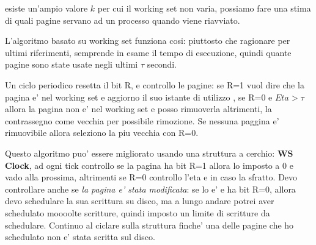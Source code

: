        esiste un'ampio valore $k$ per cui il working set non varia, possiamo fare una stima di quali pagine
        servano ad un processo quando viene riavviato.

        L'algoritmo basato su working set funziona cosi: piuttosto che ragionare per ultimi riferimenti, semprende
        in esame il tempo di esecuzione, quindi quante pagine sono state usate negli ultimi $\tau$ secondi.

        Un ciclo periodico resetta il bit R, e controllo le pagine: se R=1 vuol dire che la pagina e' nel working set e aggiorno il suo istante di utilizzo
        , se R=0 e $Eta>\tau$ allora la pagina non e' nel working set e posso rimuoverla altrimenti, la contrassegno come vecchia per possibile rimozione.
        Se nessuna paggina e' rimuovibile allora seleziono la piu vecchia con R=0. 

        Questo algoritmo puo' essere migliorato usando una struttura a cerchio: \textbf{WS Clock}, ad ogni tick controllo se la pagina 
        ha bit R=1 allora lo imposto a 0 e vado alla prossima, altrimenti se R=0 controllo l'eta e in caso la sfratto. Devo controllare anche se \textit{la pagina e' stata modificata}:
        se lo e' e ha bit R=0, allora devo schedulare la sua scrittura su disco, ma a lungo andare potrei aver schedulato moooolte scritture, quindi imposto un limite di scritture da schedulare.
        Continuo al ciclare sulla struttura finche' una delle pagine che ho schedulato non e' stata scritta sul disco.